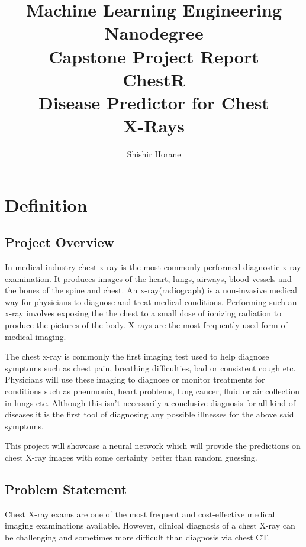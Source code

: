 \documentclass{article}
\begin{document}
    \title{\vspace{-3em}
        Machine Learning Engineering Nanodegree \\
        \large Capstone Project Report \\
        \huge ChestR \\
        \large Disease Predictor for Chest \\
        X-Rays} 
    \author{Shishir Horane}
 
    \maketitle 

    \section{Definition}
    \subsection{Project Overview}
    In medical industry chest x-ray is the most commonly performed diagnostic x-ray examination. It produces images of the heart, lungs, airways, blood vessels and the bones of the spine and chest. An x-ray(radiograph) is a non-invasive medical way for physicians to diagnose and treat medical conditions. Performing such an x-ray involves exposing the the chest to a small dose of ionizing radiation to produce the pictures of the body. X-rays are the most frequently used form of medical imaging. 
    
    The chest x-ray is commonly the first imaging test used to help diagnose symptoms such as chest pain, breathing difficulties, bad or consistent cough etc. Physicians will use these imaging to diagnose or monitor treatments for conditions such as pneumonia, heart problems, lung cancer, fluid or air collection in lungs etc. Although this isn't necessarily a conclusive diagnosis for all kind of diseases it is the first tool of diagnosing any possible illnesses for the above said symptoms.\cite{xray-details} 

    This project will showcase a neural network which will provide the predictions on chest X-ray images with some certainty better than random guessing. 

    \subsection{Problem Statement}
    Chest X-ray exams are one of the most frequent and cost-effective medical imaging examinations available. However, clinical diagnosis of a chest X-ray can be challenging and sometimes more difficult than diagnosis via chest CT.\cite{nih-kaggle}
    
\end{document}
